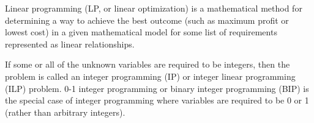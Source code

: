 Linear programming (LP, or linear optimization) is a mathematical method for
determining a way to achieve the best outcome (such as maximum profit or
lowest cost) in a given mathematical model for some list of requirements
represented as linear relationships.

If some or all of the unknown variables are required to be integers, then the
problem is called an integer programming (IP) or integer linear programming
(ILP) problem.  0-1 integer programming or binary integer programming (BIP) is
the special case of integer programming where variables are required to be 0 or
1 (rather than arbitrary integers).
